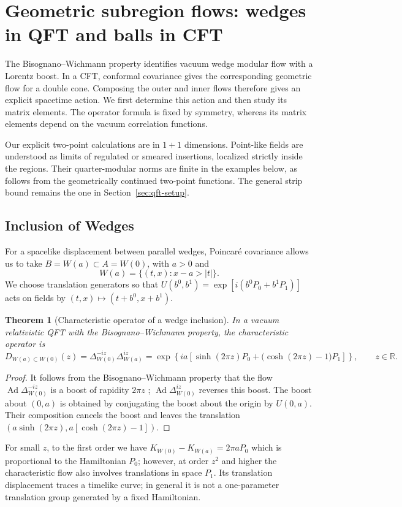 \documentclass[a4paper,11pt]{article}
\newtheorem{theorem}{Theorem}
\theoremstyle{definition}
\begin{document}
\section{Geometric subregion flows: wedges in QFT and balls in CFT}
\label{sec:geometric-subregion-flows}

The Bisognano--Wichmann property identifies vacuum wedge modular flow with a
Lorentz boost. In a CFT, conformal covariance gives the corresponding geometric
flow for a double cone. Composing the outer and inner flows therefore gives an
explicit spacetime action. We first determine this action and then study its
matrix elements. The operator formula is fixed by symmetry, whereas its matrix
elements depend on the vacuum correlation functions.

Our explicit two-point calculations are in $1+1$ dimensions. Point-like fields
are understood as limits of regulated or smeared insertions, localized strictly
inside the regions. Their quarter-modular norms are finite in the examples below,
as follows from the geometrically continued two-point functions. The general
strip bound remains the one in Section~\ref{sec:qft-setup}.

\subsection{Inclusion of Wedges}
\label{subsec:wedge-inclusion}

For a spacelike displacement between parallel wedges, Poincar\'e covariance allows us to take $B=W(a)\subset A=W(0)$, with $a>0$ and
\[
 W(a)=\{(t,x):x-a>|t|\}.
\]
We choose translation generators so that $U(b^0,b^1)=\exp[i(b^0P_0+b^1P_1)]$ acts on fields by $(t,x)\mapsto(t+b^0,x+b^1)$.

\begin{theorem}[Characteristic operator of a wedge inclusion]
\label{thm:wedge-characteristic}
In a vacuum relativistic QFT with the Bisognano--Wichmann property, the characteristic operator is
\begin{equation}
 D_{W(a)\subset W(0)}(z)=\Delta_{W(0)}^{-iz}\Delta_{W(a)}^{iz}
 =\exp\!\left\{ia\left[\sinh(2\pi z)P_0
       +\bigl(\cosh(2\pi z)-1\bigr)P_1\right]\right\},
 \qquad z\in\mathbb R.
 \label{eq:wedge-characteristic}
\end{equation}
\end{theorem}
\begin{proof}
It follows from the Bisognano--Wichmann property that the flow $\operatorname{Ad}\Delta_{W(0)}^{-iz}$ is a boost of rapidity $2\pi z$ \cite{bisognanowichmann}; $\operatorname{Ad}\Delta_{W(0)}^{iz}$ reverses this boost. The boost about $(0,a)$ is obtained by conjugating the boost about the origin by $U(0,a)$. Their composition cancels the boost and leaves the translation $(a\sinh(2\pi z),a[\cosh(2\pi z)-1])$.
\end{proof}
For small $z$, to the first order we have $K_{W(0)}-K_{W(a)}=2\pi aP_0$ which is proportional to the Hamiltonian $P_0$; however, at order $z^2$ and higher the characteristic flow 
 also involves translations in space $P_1$. Its translation displacement traces a timelike curve;
in general it is not a one-parameter translation group generated by a fixed Hamiltonian.
\end{document}
